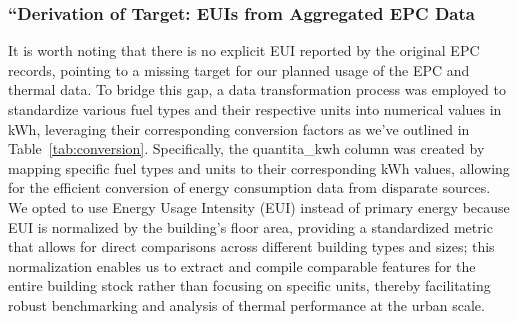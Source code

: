 \documentclass[preprint,12pt]{elsarticle}
\begin{document}
    \subsubsection{“Derivation of Target: EUIs from Aggregated EPC Data}
        It is worth noting that there is no explicit EUI reported by the original EPC records, pointing to a missing target for our planned usage of the EPC and thermal data. To bridge this gap, a data transformation process was employed to standardize various fuel types and their respective units into numerical values in kWh, leveraging their corresponding conversion factors as we've outlined in Table~\ref{tab:conversion}. Specifically, the quantita\_kwh column was created by mapping specific fuel types and units to their corresponding kWh values, allowing for the efficient conversion of energy consumption data from disparate sources. We opted to use Energy Usage Intensity (EUI) instead of primary energy because EUI is normalized by the building’s floor area, providing a standardized metric that allows for direct comparisons across different building types and sizes; this normalization enables us to extract and compile comparable features for the entire building stock rather than focusing on specific units, thereby facilitating robust benchmarking and analysis of thermal performance at the urban scale.
\end{document}
